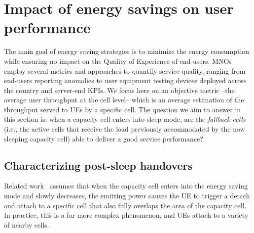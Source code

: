 \vspace{-2pt}
\section{Impact of energy savings on user performance}
\label{sec:evaluation-energy_savings}
\vspace{-4pt}

The main goal of energy saving strategies is to minimize the energy consumption while ensuring no impact on the Quality of Experience of end-users.
MNOs employ several metrics and approaches to quantify service quality, ranging from end-users reporting anomalies to user equipment testing devices deployed across the country and server-end KPIs. 
We focus here on an objective metric --the average user throughput at the cell level-- which is an average estimation of the throughput served to UEs by a specific cell. 
The question we aim to answer in this section is: when a capacity cell enters into sleep mode, are the \textit{fallback cells} (i.e., the active cells that receive the load previously accommodated by the now sleeping capacity cell) able to deliver a good service performance?

\vspace{-2pt}
\subsection{Characterizing post-sleep handovers}
\vspace{-2pt}

Related work~\cite{celebi2019load, shahid2020load, teng2021joint} assumes that when the capacity cell enters into the energy saving mode and slowly decreases, the emitting power causes the UE to trigger a detach and attach to a specific cell that also fully overlaps the area of the capacity cell. In practice, this is a far more complex phenomenon, and UEs attach to a variety of nearby cells.  

